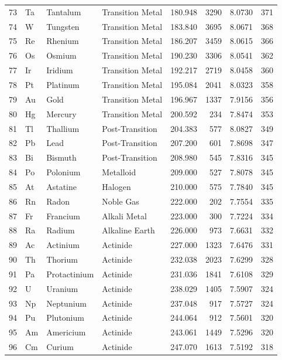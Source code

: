 \documentclass[11pt,a4paper]{article}
\begin{document}
\begin{longtable}{rlllrrrr}
  73 & Ta & Tantalum & Transition Metal & 180.948 & 3290 & 8.0730 & 371 \\
  74 & W & Tungsten & Transition Metal & 183.840 & 3695 & 8.0671 & 368 \\
  75 & Re & Rhenium & Transition Metal & 186.207 & 3459 & 8.0615 & 366 \\
  76 & Os & Osmium & Transition Metal & 190.230 & 3306 & 8.0541 & 362 \\
  77 & Ir & Iridium & Transition Metal & 192.217 & 2719 & 8.0458 & 360 \\
  78 & Pt & Platinum & Transition Metal & 195.084 & 2041 & 8.0323 & 358 \\
  79 & Au & Gold & Transition Metal & 196.967 & 1337 & 7.9156 & 356 \\
  80 & Hg & Mercury & Transition Metal & 200.592 & 234 & 7.8474 & 353 \\
  81 & Tl & Thallium & Post-Transition & 204.383 & 577 & 8.0827 & 349 \\
  82 & Pb & Lead & Post-Transition & 207.200 & 601 & 7.8698 & 347 \\
  83 & Bi & Bismuth & Post-Transition & 208.980 & 545 & 7.8316 & 345 \\
  84 & Po & Polonium & Metalloid & 209.000 & 527 & 7.8078 & 345 \\
  85 & At & Astatine & Halogen & 210.000 & 575 & 7.7840 & 345 \\
  86 & Rn & Radon & Noble Gas & 222.000 & 202 & 7.7554 & 335 \\
  87 & Fr & Francium & Alkali Metal & 223.000 & 300 & 7.7224 & 334 \\
  88 & Ra & Radium & Alkaline Earth & 226.000 & 973 & 7.6631 & 332 \\
  89 & Ac & Actinium & Actinide & 227.000 & 1323 & 7.6476 & 331 \\
  90 & Th & Thorium & Actinide & 232.038 & 2023 & 7.6299 & 328 \\
  91 & Pa & Protactinium & Actinide & 231.036 & 1841 & 7.6108 & 329 \\
  92 & U & Uranium & Actinide & 238.029 & 1405 & 7.5907 & 324 \\
  93 & Np & Neptunium & Actinide & 237.048 & 917 & 7.5727 & 324 \\
  94 & Pu & Plutonium & Actinide & 244.064 & 912 & 7.5601 & 320 \\
  95 & Am & Americium & Actinide & 243.061 & 1449 & 7.5296 & 320 \\
  96 & Cm & Curium & Actinide & 247.070 & 1613 & 7.5192 & 318 \\

\end{longtable}
\end{document}

